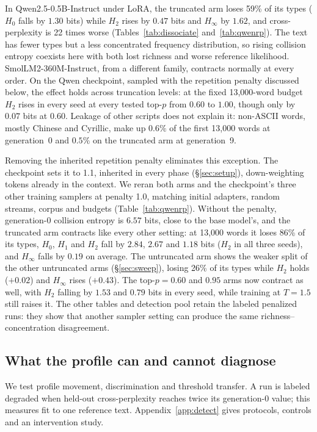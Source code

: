 \documentclass[10pt]{article}
\theoremstyle{plain}
\theoremstyle{definition}
\newcommand{\Htwo}{H_2}
\newcommand{\Hz}{H_0}
\newcommand{\Hinf}{H_\infty}
\begin{document}
In Qwen2.5-0.5B-Instruct under LoRA, the truncated arm loses 59\% of its types ($\Hz$ falls by
$1.30$ bits) while $\Htwo$ rises by $0.47$ bits and $\Hinf$ by $1.62$, and cross-perplexity is
22 times worse (Tables~\ref{tab:dissociate} and~\ref{tab:qwenrp}). The text has fewer types but a less concentrated
frequency distribution, so rising collision entropy coexists here with both lost richness and
worse reference likelihood. SmolLM2-360M-Instruct, from a different family, contracts normally at
every order. On the Qwen checkpoint, sampled with the repetition penalty discussed below, the
effect holds across truncation levels: at the fixed 13,000-word budget $\Htwo$ rises in every seed at every tested top-$p$ from $0.60$ to $1.00$,
though only by $0.07$ bits at $0.60$. Leakage of other scripts does not explain it:
non-ASCII words, mostly Chinese and Cyrillic, make up $0.6\%$ of the first 13,000 words at
generation~0 and $0.5\%$ on the truncated arm at generation~9.

Removing the inherited repetition penalty eliminates this exception. The checkpoint sets it to
1.1, inherited in every phase (\S\ref{sec:setup}), down-weighting tokens already in the context.
We reran both arms and the checkpoint's three other training samplers at penalty 1.0, matching
initial adapters, random streams, corpus and budgets (Table~\ref{tab:qwenrp}). Without the penalty, generation-0 collision entropy is $6.57$
bits, close to the base model's, and the truncated arm contracts like every other setting: at
13,000 words it loses 86\% of its types, $\Hz$, $H_1$ and $\Htwo$ fall by $2.84$, $2.67$ and
$1.18$ bits ($\Htwo$ in all three seeds), and $\Hinf$ falls by $0.19$ on average. The untruncated
arm shows the weaker split of the other untruncated arms (\S\ref{sec:sweep}), losing 26\% of its types while $\Htwo$ holds ($+0.02$) and $\Hinf$ rises ($+0.43$). The
top-$p=0.60$ and $0.95$ arms now contract as well, with $\Htwo$ falling by $1.53$ and $0.79$ bits
in every seed, while training at $T=1.5$ still raises it. The other tables and detection pool retain the labeled penalized runs: they show that
another sampler setting can produce the same richness--concentration disagreement.

\subsection{What the profile can and cannot diagnose}
\label{sec:detect}

We test profile movement, discrimination and threshold transfer. A run is labeled degraded
when held-out cross-perplexity reaches twice its generation-0 value; this measures fit to one
reference text. Appendix~\ref{app:detect} gives protocols, controls and an intervention study.
\end{document}
